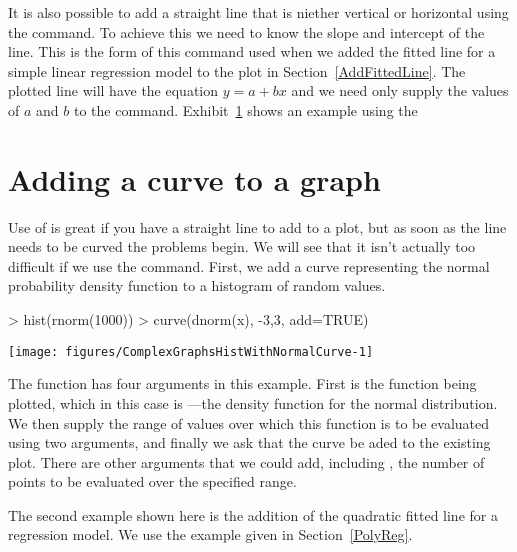 It is also possible to add a straight line that is niether vertical or horizontal using the  command. To achieve this we need to know the slope and intercept of the line. This is the form of this command used when we added the fitted line for a simple linear regression model to the plot in Section~\ref{AddFittedLine}. The plotted line will have the equation $y=a+bx$ and we need only supply the values of $a$ and $b$ to the  command. Exhibit~\ref{} shows an example using the  
 
\section{Adding a curve to a graph} 
 
Use of  is great if you have a straight line to add to a plot, but as soon as the line needs to be curved the problems begin. We will see that it isn't actually too difficult if we use the  command. First, we add a curve representing the normal probability density function to a histogram of random values. 

\begin{Schunk}
\begin{Sinput}
> hist(rnorm(1000)) 
> curve(dnorm(x), -3,3, add=TRUE) 
\end{Sinput}

\texttt{[image: figures/ComplexGraphsHistWithNormalCurve-1]} \end{Schunk}

 
The  function has four arguments in this example. First is the function being plotted, which in this case is  ---the density function for the normal distribution. We then supply the range of values over which this function is to be evaluated using two arguments, and finally we ask that the curve be aded to the existing plot. There are other arguments that we could add, including , the number of points to be evaluated over the specified range. 
 
The second example shown here is the addition of the quadratic fitted line for a regression model. We use the example given in Section~\ref{PolyReg}. 


